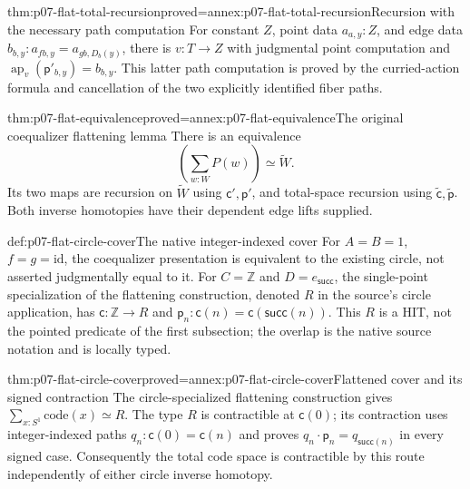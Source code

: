 \begin{hblemma}{thm:p07-flat-total-recursion}{proved=annex:p07-flat-total-recursion}{Recursion with the necessary path computation}
For constant \(Z\), point data \(a_{a,y}:Z\), and edge data
\(b_{b,y}:a_{fb,y}=a_{gb,D_b(y)}\), there is \(v:T\to Z\) with
judgmental point computation and
\(\operatorname{ap}_v(\mathsf p'_{b,y})=b_{b,y}\).
This latter path computation is proved by the curried-action formula
and cancellation of the two explicitly identified fiber paths.
\end{hblemma}

\begin{hbtheorem}{thm:p07-flat-equivalence}{proved=annex:p07-flat-equivalence}{The original coequalizer flattening lemma}
There is an equivalence
\[
\left(\sum_{w:W}P(w)\right)\simeq\widetilde W.
\]
Its two maps are recursion on \(\widetilde W\) using
\(\mathsf c',\mathsf p'\), and total-space recursion using
\(\widetilde{\mathsf c},\widetilde{\mathsf p}\).
Both inverse homotopies have their dependent edge lifts supplied.
\end{hbtheorem}

\begin{hbdefinition}{def:p07-flat-circle-cover}{The native integer-indexed cover}
For \(A=B=1\), \(f=g=\mathrm{id}\), the coequalizer presentation
is equivalent to the existing circle, not asserted judgmentally equal
to it. For \(C=\mathbb Z\) and \(D=e_{\mathsf{succ}}\), the
single-point specialization of the flattening construction, denoted
\(R\) in the source's circle application,
has \(\mathsf c:\mathbb Z\to R\) and
\(\mathsf p_n:\mathsf c(n)=\mathsf c(\mathsf{succ}(n))\).
This \(R\) is a HIT, not the pointed predicate of the first subsection;
the overlap is the native source notation and is locally typed.
\end{hbdefinition}

\begin{hbtheorem}{thm:p07-flat-circle-cover}{proved=annex:p07-flat-circle-cover}{Flattened cover and its signed contraction}
The circle-specialized flattening construction gives
\(\sum_{x:S^1}\mathrm{code}(x)\simeq R\).
The type \(R\) is contractible at \(\mathsf c(0)\); its contraction
uses integer-indexed paths \(q_n:\mathsf c(0)=\mathsf c(n)\)
and proves \(q_n\cdot\mathsf p_n=q_{\mathsf{succ}(n)}\) in every
signed case. Consequently the total code space is contractible by
this route independently of either circle inverse homotopy.
\end{hbtheorem}

